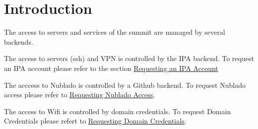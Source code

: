 \section{Introduction}

The access to servers and services of the summit are managed by several backends.

The access to servers (ssh) and VPN is controlled by the IPA backend. To request an IPA account please refer to the section \hyperref[sec:IPA]{Requesting an IPA Account}

The acccess to Nublado is controlled by a Github backend. To request Nublado access please refer to \hyperref[sec:Nublado]{Requesting Nublado Access}.

The access to Wifi is controlled by domain credentials. To request Domain Credentials please refert to \hyperref[sec:Domain]{Requesting Domain Credentials}.